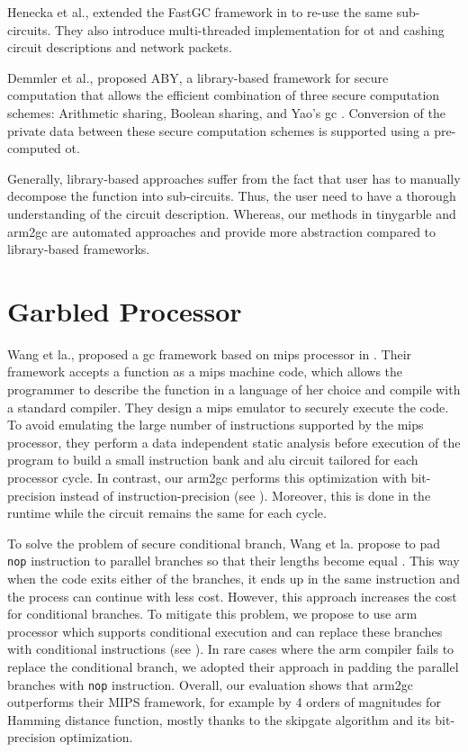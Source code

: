 Henecka et al., extended the FastGC framework in \cite{henecka2013faster} to re-use the same sub-circuits.
They also introduce multi-threaded implementation for \acrshort{ot} and cashing circuit descriptions and network packets.

Demmler et al., proposed ABY, a library-based framework for secure computation that allows the efficient combination of three secure computation schemes: Arithmetic sharing, Boolean sharing, and Yao’s \acrshort{gc} \cite{demmler2015aby}.
Conversion of the private data between these secure computation schemes is supported using a pre-computed \acrshort{ot}.

Generally, library-based approaches suffer from the fact that user has to manually decompose the function into sub-circuits.
Thus, the user need to have a thorough understanding of the circuit description.
Whereas, our methods in \gls{tinygarble} and \gls{arm2gc} are automated approaches and provide more abstraction compared to library-based frameworks.

\section{Garbled Processor}\label{sec:related-processor}
Wang et la., proposed a \acrshort{gc} framework based on \gls{mips} processor in \cite{wang2016secure}.
Their framework accepts a function as a \gls{mips} machine code, which allows the programmer to describe the function in a language of her choice and compile with a standard compiler.
They design a \gls{mips} emulator to securely execute the code.
To avoid emulating the large number of instructions supported by the \gls{mips} processor, they perform a data independent static analysis before execution of the program to build a small instruction bank and \acrshort{alu} circuit tailored for each processor cycle.
In contrast, our \gls{arm2gc} performs this optimization with bit-precision instead of instruction-precision (see ).
Moreover, this is done in the runtime while the circuit remains the same for each cycle.

To solve the problem of secure conditional branch, Wang et la. propose to pad \texttt{nop} instruction to parallel branches so that their lengths become equal \cite{wang2016secure}.
This way when the code exits either of the branches, it ends up in the same instruction and the process can continue with less cost.
However, this approach increases the cost for conditional branches.
To mitigate this problem, we propose to use \gls{arm} processor which supports conditional execution and can replace these branches with conditional instructions (see ).
In rare cases where the \gls{arm} compiler fails to replace the conditional branch, we adopted their approach in padding the parallel branches with \texttt{nop} instruction.
Overall, our evaluation shows that \gls{arm2gc} outperforms their MIPS framework, for example by 4 orders of magnitudes for Hamming distance function, mostly thanks to the \gls{skipgate} algorithm and its bit-precision optimization.

